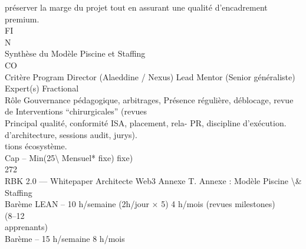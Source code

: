 \documentclass[12pt,landscape,a4paper]{article}
\begin{document}
préserver la marge du projet tout en assurant une qualité d’encadrement premium.\\
\vspace{0.5em}
\vspace{0.5em}
\vspace{0.5em}
\vspace{0.5em}
FI\\
N\\
Synthèse du Modèle Piscine et Staffing\\
CO\\
Critère          Program Director (Alaeddine / Nexus) Lead Mentor (Senior généraliste)                        Expert(s) Fractional\\
\vspace{0.5em}
Rôle             Gouvernance pédagogique, arbitrages, Présence régulière, déblocage, revue de Interventions “chirurgicales” (revues\\
Principal        qualité, conformité ISA, placement, rela- PR, discipline d’exécution.        d’architecture, sessions audit, jurys).\\
tions écosystème.\\
\vspace{0.5em}
Cap              –                                             Min(25\textbackslash{}%
Mensuel*                                                       fixe)                               fixe)\\
\vspace{0.5em}
\vspace{0.5em}
\vspace{0.5em}
\vspace{0.5em}
272\\
RBK 2.0 — Whitepaper Architecte Web3                                           Annexe T. Annexe : Modèle Piscine \textbackslash{}& Staffing\\
\vspace{0.5em}
\vspace{0.5em}
\vspace{0.5em}
\vspace{0.5em}
Barème LEAN –                          10 h/semaine (2h/jour × 5)            4 h/mois (revues milestones)\\
(8–12\\
apprenants)\\
\vspace{0.5em}
Barème         –                       15 h/semaine                          8 h/mois\\
\end{document}
